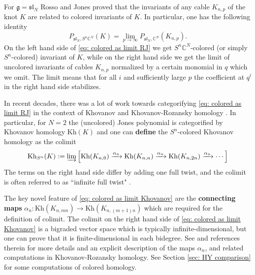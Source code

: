 \documentclass{amsart}
\newcommand{\Kh}{\mathrm{Kh}}
\newcommand{\C}{\mathbb{C}}
\begin{document}
For $\mathfrak{g}=\mathfrak{sl}_N$ Rosso and Jones \cite{RJ} proved that the invariants of any cable $K_{n,p}$ of the knot $K$ are related to colored invariants of $K$. In particular, one has the following identity
\begin{equation}
\label{eq: colored as limit RJ}
P_{\mathfrak{sl}_N,S^n\C^N}(K)=\lim_{p\to \infty} P_{\mathfrak{sl}_N,\C^N}(K_{n,p}).
\end{equation}
On the left hand side of \eqref{eq: colored as limit RJ} we get $S^n\C^N$-colored (or simply $S^n$-colored) invariant of $K$, while on the right hand side we get the limit of uncolored invariants of cables $K_{n,p}$ normalized by a certain monomial in $q$ which we omit. The limit means that for all $i$ and sufficiently large $p$ the coefficient at $q^i$ in the right hand side stabilizes. 

In recent decades, there was a lot of work \cite{Cautis,CK,Hogancamp, Hogancamp2,Rozansky} towards categorifying \eqref{eq: colored as limit RJ} in the context of Khovanov and Khovanov-Rozansky homology \cite{Kh,KR1,KR2}. In particular, for $N=2$ the (uncolored) Jones polynomial is categorified by Khovanov homology $\Kh(K)$  and one can {\bf define} the $S^n$-colored Khovanov homology as the colimit
\begin{equation}
\label{eq: colored as limit Khovanov}
\Kh_{S^n}(K):=\varinjlim\left[\Kh(K_{n,0})\xrightarrow{\alpha_n}\Kh(K_{n,n})\xrightarrow{\alpha_n}\Kh(K_{n,2n})\xrightarrow{\alpha_n} \cdots\right]
\end{equation}
The terms on the right hand side differ by adding one full twist, and the colimit is often referred to as ``infinite full twist" \cite{Rozansky}. 



The key novel feature of \eqref{eq: colored as limit Khovanov} are the {\bf connecting maps} $\alpha_n:\Kh\left(K_{n,mn}\right)\to \Kh\left(K_{n,(m+1)n}\right)$   which are required for the definition of colimit. The colimit on the right hand side of \eqref{eq: colored as limit Khovanov} is a bigraded vector space which is typically infinite-dimensional, but one can prove that it is finite-dimensional in each bidegree. See \cite{CK,Hogancamp, Hogancamp2,Rozansky} and references therein for more details and an explicit description of the maps $\alpha_n$, and related computations in Khovanov-Rozansky homology. See Section \ref{sec: HY comparison} for some computations of colored homology.
\end{document}
